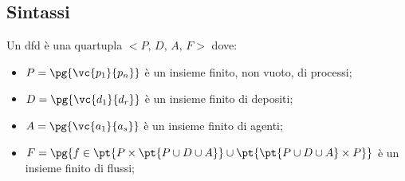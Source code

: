 \subsection{Sintassi}\label{sub:dfd_sintassi} %
Un \ac{dfd} è una quartupla $<P,\,D,\,A,\,F>$ dove:
\begin{itemize}
    \item $P = \pg{\vc{p_1}{p_n}}$ è un insieme finito, non vuoto, di processi;
    \item $D = \pg{\vc{d_1}{d_r}}$ è un insieme finito di depositi;
    \item $A = \pg{\vc{a_1}{a_s}}$ è un insieme finito di agenti;
    \item $F = \pg{ f \in \pt{P\times \pt{P \cup D \cup A}} \cup \pt{\pt{P\cup D\cup A} \times P}}$ è un insieme finito di flussi;
\end{itemize}
%
